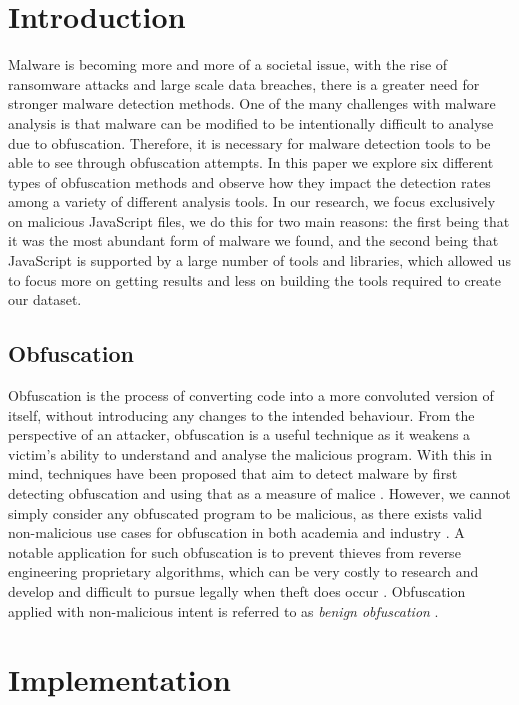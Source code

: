 \documentclass[sigplan,10pt,review, nonacm=true]{acmart}\settopmatter{printfolios=true,printccs=false,printacmref=false}
\begin{document}
\section{Introduction}

Malware is becoming more and more of a societal issue, with the rise of ransomware attacks and large scale data breaches, there is a greater need for stronger malware detection methods. One of the many challenges with malware analysis is that malware can be modified to be intentionally difficult to analyse due to obfuscation. Therefore, it is necessary for malware detection tools to be able to see through obfuscation attempts. In this paper we explore six different types of obfuscation methods and observe how they impact the detection rates among a variety of different analysis tools.
In our research, we focus exclusively on malicious JavaScript files, we do this for two main reasons: the first being that it was the most abundant form of malware we found, and the second being that JavaScript is supported by a large number of tools and libraries, which allowed us to focus more on getting results and less on building the tools required to create our dataset.

\subsection{Obfuscation}
Obfuscation is the process of converting code into a more convoluted version of itself, without introducing any changes to the intended behaviour. From the perspective of an attacker, obfuscation is a useful technique as it weakens a victim's ability to understand and analyse the malicious program. With this in mind, techniques have been proposed that aim to detect malware by first detecting obfuscation and using that as a measure of malice \cite{Blanc}. However, we cannot simply consider any obfuscated program to be malicious, as there exists valid non-malicious use cases for obfuscation in both academia and industry \cite{Blanc}. A notable application for such obfuscation is to prevent thieves from reverse engineering proprietary algorithms, which can be very costly to research and develop and difficult to pursue legally when theft does occur \cite{Colberg}. Obfuscation applied with non-malicious intent is referred to as \textit{benign obfuscation} \cite{XuZhang}.

\section{Implementation}
\end{document}
